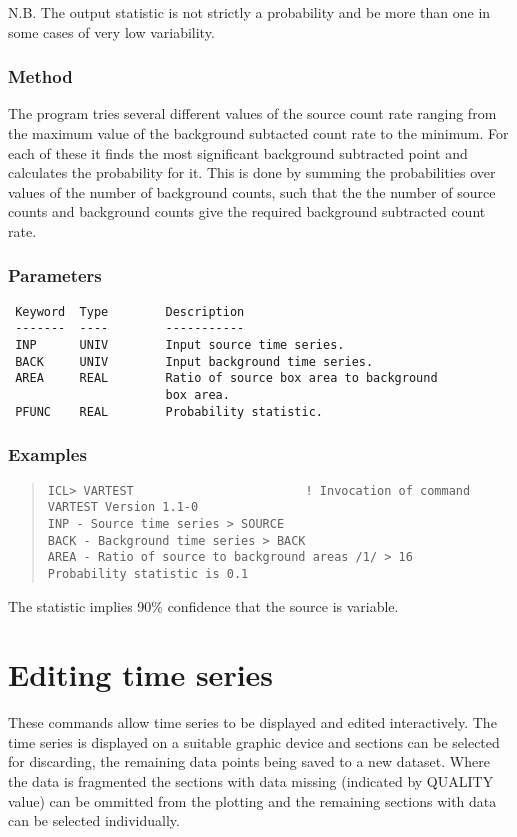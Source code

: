 \documentclass{book}
\renewcommand{\_}{{\tt\char'137}}     %
\begin{document}
N.B. The output statistic is not strictly a probability
and be more than one in some cases of very low
variability.

\subsection{Method}
The program tries several different values of the source count rate
ranging from the maximum value of the background subtacted count rate
to the minimum. For each of these it finds the most significant
background subtracted point and calculates the probability for it.
This is done by summing the probabilities over values of the number
of background counts, such that the the number of source counts and
background counts give the required background subtracted count rate.

\subsection{Parameters}
\begin{verbatim}
 Keyword  Type        Description
 -------  ----        -----------
 INP      UNIV        Input source time series.
 BACK     UNIV        Input background time series.
 AREA     REAL        Ratio of source box area to background
                      box area.
 PFUNC    REAL        Probability statistic.
\end{verbatim}\subsection{Examples}
\begin{quote}\begin{verbatim}
ICL> VARTEST                        ! Invocation of command
VARTEST Version 1.1-0
INP - Source time series > SOURCE
BACK - Background time series > BACK
AREA - Ratio of source to background areas /1/ > 16
Probability statistic is 0.1
\end{verbatim}\end{quote}
The statistic implies 90\% confidence that the source is variable.
\chapter{Editing time series}
These commands allow time series to be displayed and edited interactively.
The time series is displayed on a suitable graphic device and sections
can be selected for discarding, the remaining data points being saved
to a new dataset. Where the data is fragmented the sections with data
missing (indicated by QUALITY value) can be ommitted from the plotting
and the remaining sections with data can be selected individually.
\end{document}
